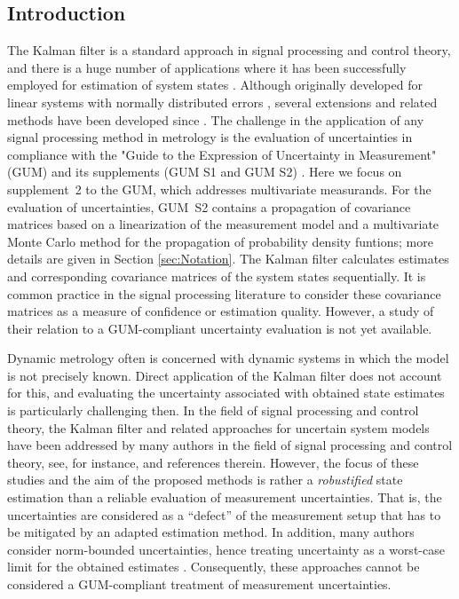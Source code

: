 \documentclass[10pt]{article}
\begin{document}
\begin{spacing}{1}
\vspace{1pc}

\section{Introduction}
The Kalman filter is a standard approach in signal processing and control theory, and there is a huge number of applications where it has been successfully employed for estimation of system states \cite{Garcia:2013kq, Kollar:1988ek, Heins:2014uv}. Although originally developed for linear systems with normally distributed errors \cite{Kalman, Kalman-Bucy}, several extensions and related methods have been developed since \cite{Julier:2004go}.
The challenge in the application of any signal processing method in metrology is the evaluation of uncertainties in compliance with the "Guide to the Expression of Uncertainty in Measurement" (GUM) \cite{GUM} and its supplements (GUM S1 and GUM S2) \cite{GUMS1, GUMS2}. Here we focus on supplement~2 to the GUM, which addresses multivariate measurands. For the evaluation of uncertainties, GUM~S2 contains a propagation of covariance matrices based on a linearization of the measurement model and a multivariate Monte Carlo method for the propagation of probability density funtions; more details are given in Section \ref{sec:Notation}.  
The Kalman filter calculates estimates and corresponding covariance matrices of the system states sequentially. It is common practice in the signal processing literature to consider these covariance matrices as a measure of confidence or estimation quality. However, a study of their relation to a GUM-compliant uncertainty evaluation is not yet available. 

Dynamic metrology \cite{Eichstadt2012Diss} often is concerned with dynamic systems in which the model is not precisely known. Direct application of the Kalman filter does not account for this, and evaluating the uncertainty associated with obtained state estimates is particularly challenging then.
In the field of signal processing and control theory, the Kalman filter and related approaches for uncertain system models have been addressed by many authors in the field of signal processing and control theory, see, for instance, \cite{LEONDES:2007cz, Souto:2009bj, Xia:2005wb} and references therein. However, the focus of these studies and the aim of the proposed methods is rather a \emph{robustified} state estimation than a reliable evaluation of measurement uncertainties. That is, the uncertainties are considered as a ``defect'' of the measurement setup that has to be mitigated by an adapted estimation method. In addition, many authors consider norm-bounded uncertainties, hence treating uncertainty as a worst-case limit for the obtained estimates \cite{LEONDES:2007cz}. Consequently, these approaches cannot be considered a GUM-compliant treatment of measurement uncertainties.


\end{spacing}
\end{document}
